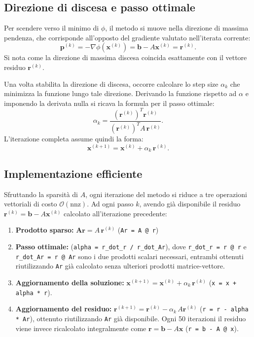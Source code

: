 \documentclass[a4paper, 12pt]{report}
\begin{document}
\subsection*{Direzione di discesa e passo ottimale}

Per scendere verso il minimo di $\phi$, il metodo si muove nella direzione
di massima pendenza, che corrisponde all'opposto del
gradiente valutato nell'iterata corrente:
\[
    \mathbf{p}^{(k)} = -\nabla\phi(\mathbf{x}^{(k)}) = \mathbf{b} - A\mathbf{x}^{(k)} = \mathbf{r}^{(k)}.
\]
Si nota come la direzione di massima discesa coincida esattamente con
il vettore residuo $\mathbf{r}^{(k)}$.

Una volta stabilita la direzione di discesa, occorre calcolare lo step size $\alpha_k$ che minimizza la funzione lungo tale direzione.
Derivando la funzione rispetto ad $\alpha$ e imponendo la derivata nulla
si ricava la formula per il passo ottimale:
\[
    \alpha_k = \frac{\left(\mathbf{r}^{(k)}\right)^T \mathbf{r}^{(k)}}{\left(\mathbf{r}^{(k)}\right)^T A\,\mathbf{r}^{(k)}}.
\]
L'iterazione completa assume quindi la forma:
\[
    \mathbf{x}^{(k+1)} = \mathbf{x}^{(k)} + \alpha_k\,\mathbf{r}^{(k)}.
\]

\subsection*{Implementazione efficiente}

Sfruttando la sparsità di $A$, ogni iterazione del metodo si riduce
a tre operazioni vettoriali di costo $\mathcal{O}(\mathrm{nnz})$.
Ad ogni passo $k$, avendo già disponibile il residuo
$\mathbf{r}^{(k)}= \mathbf{b} - A\mathbf{x}^{(k)}$
calcolato all'iterazione precedente:
\begin{enumerate}
    \item \textbf{Prodotto sparso: }
          $\mathbf{Ar} = A\,\mathbf{r}^{(k)}$\quad
          (\texttt{Ar = A @ r})
          
    \item \textbf{Passo ottimale:}
         (\texttt{alpha = r\_dot\_r / r\_dot\_Ar}),
          dove \texttt{r\_dot\_r = r @ r} e \texttt{r\_dot\_Ar = r @ Ar}
          sono i due prodotti scalari necessari, entrambi ottenuti
          riutilizzando \texttt{Ar} già calcolato senza ulteriori
          prodotti matrice-vettore.
    \item \textbf{Aggiornamento della soluzione:}
          $\mathbf{x}^{(k+1)} = \mathbf{x}^{(k)} + \alpha_k\,\mathbf{r}^{(k)}$\quad
          (\texttt{x = x + alpha * r}).

    \item \textbf{Aggiornamento del residuo:}
          $\mathbf{r}^{(k+1)} = \mathbf{r}^{(k)} - \alpha_k\,A\mathbf{r}^{(k)}$\quad
          (\texttt{r = r - alpha * Ar}),
          ottenuto riutilizzando \texttt{Ar} già disponibile.
          Ogni 50 iterazioni il residuo viene invece ricalcolato
          integralmente come $\mathbf{r} = \mathbf{b} - A\mathbf{x}$\quad
          (\texttt{r = b - A @ x}).
\end{enumerate}
\end{document}
